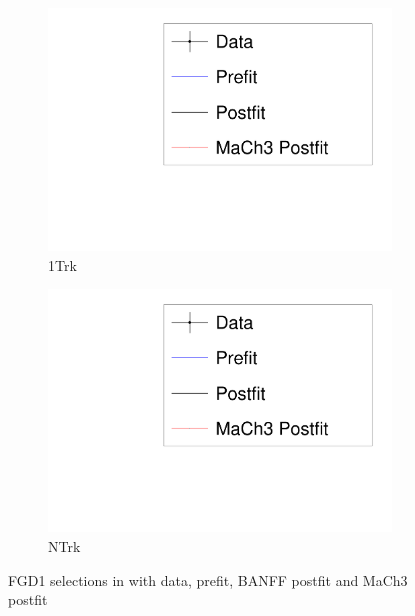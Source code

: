 \begin{figure}
\begin{subfigure}[t]{0.24\textwidth}
		\includegraphics[width=\textwidth, trim={5mm 3mm 15mm 10mm}, clip, page=7]{figures/mach3/banff/mach3banff_mom}
		\caption{\numu 1Trk}
	\end{subfigure}
	\begin{subfigure}[t]{0.24\textwidth}
		\includegraphics[width=\textwidth, trim={5mm 3mm 15mm 10mm}, clip, page=8]{figures/mach3/banff/mach3banff_mom}
		\caption{\numu NTrk}
	\end{subfigure}
	\caption{FGD1 selections in \pmu with data, prefit, BANFF postfit and MaCh3 postfit}
	\label{fig:mach3_banff_postfit_fgd1}
\end{figure}

